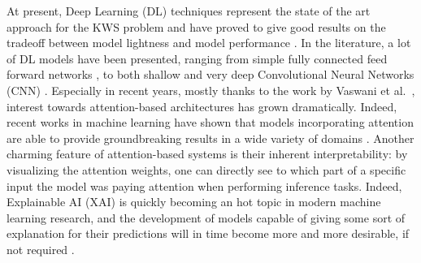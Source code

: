 At present, Deep Learning (DL) techniques represent the state of the art approach for the KWS problem and have proved to give good results on the tradeoff between model lightness and model performance \cite{dnns2014chen} \cite{convnns2015sainath} \cite{streamingkws2020Rybakov}. In the literature, a lot of DL models have been presented, ranging from simple fully connected feed forward networks \cite{dnns2014chen}, to both shallow and very deep Convolutional Neural Networks (CNN) \cite{deepreslearning2018tang} \cite{convnns2015sainath}
\cite{mittermaier2020small} \cite{choi2019temporal}. Especially in recent years, mostly thanks to the work by Vaswani et al.~\cite{attentionisall2017vaswani}, interest towards attention-based architectures has grown dramatically. Indeed, recent works in machine learning have shown that models incorporating attention are able to provide groundbreaking results in a wide variety of domains \cite{vit2020Dosovitskiy} \cite{touvron2021training} \cite{gulati2020conformer} \cite{kumar2021colorization} \cite{Devlin2019BERTPO}. Another charming feature of attention-based systems is their inherent interpretability: by visualizing the attention weights, one can directly see to which part of a specific input the model was paying attention when performing inference tasks. Indeed, Explainable AI (XAI) is quickly becoming an hot topic in modern machine learning research, and the development of models capable of giving some sort of explanation for their predictions  will in time become more and more desirable, if not required \cite{gdpr2017}.

